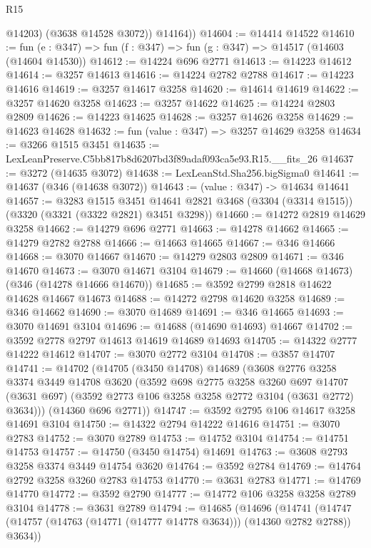 \begin{lexlean}{R15}
\begin{coremodule}
            @14203)
          (@3638 @14528 @3072))
        @14164))
@14604 := @14414 @14522
@14610 := fun (e : @347) => fun (f : @347) => fun (g : @347) => @14517 (@14603 (@14604 @14530))
@14612 := @14224 @696 @2771
@14613 := @14223 @14612
@14614 := @3257 @14613
@14616 := @14224 @2782 @2788
@14617 := @14223 @14616
@14619 := @3257 @14617 @3258
@14620 := @14614 @14619
@14622 := @3257 @14620 @3258
@14623 := @3257 @14622
@14625 := @14224 @2803 @2809
@14626 := @14223 @14625
@14628 := @3257 @14626 @3258
@14629 := @14623 @14628
@14632 := fun (value : @347) => @3257 @14629 @3258
@14634 := @3266 @1515 @3451
@14635 := LexLeanPreserve.C5bb817b8d6207bd3f89adaf093ca5e93.R15.__fits_26
@14637 := @3272 (@14635 @3072)
@14638 := LexLeanStd.Sha256.bigSigma0
@14641 := @14637 (@346 (@14638 @3072))
@14643 := (value : @347) -> @14634 @14641
@14657 := @3283
    @1515
    @3451
    @14641
    @2821
    @3468
    (@3304 (@3314 @1515))
    (@3320 (@3321 (@3322 @2821) @3451 @3298))
@14660 := @14272 @2819 @14629 @3258
@14662 := @14279 @696 @2771
@14663 := @14278 @14662
@14665 := @14279 @2782 @2788
@14666 := @14663 @14665
@14667 := @346 @14666
@14668 := @3070 @14667
@14670 := @14279 @2803 @2809
@14671 := @346 @14670
@14673 := @3070 @14671 @3104
@14679 := @14660 (@14668 @14673) (@346 (@14278 @14666 @14670))
@14685 := @3592 @2799 @2818 @14622 @14628 @14667 @14673
@14688 := @14272 @2798 @14620 @3258
@14689 := @346 @14662
@14690 := @3070 @14689
@14691 := @346 @14665
@14693 := @3070 @14691 @3104
@14696 := @14688 (@14690 @14693) @14667
@14702 := @3592 @2778 @2797 @14613 @14619 @14689 @14693
@14705 := @14322 @2777 @14222 @14612
@14707 := @3070 @2772 @3104
@14708 := @3857 @14707
@14741 := @14702
    (@14705
      (@3450 @14708)
      @14689
      (@3608
        @2776
        @3258
        @3374
        @3449
        @14708
        @3620
        (@3592
          @698
          @2775
          @3258
          @3260
          @697
          @14707
          (@3631 @697)
          (@3592 @2773 @106 @3258 @3258 @2772 @3104 (@3631 @2772) @3634)))
      (@14360 @696 @2771))
@14747 := @3592 @2795 @106 @14617 @3258 @14691 @3104
@14750 := @14322 @2794 @14222 @14616
@14751 := @3070 @2783
@14752 := @3070 @2789
@14753 := @14752 @3104
@14754 := @14751 @14753
@14757 := @14750 (@3450 @14754) @14691
@14763 := @3608 @2793 @3258 @3374 @3449 @14754 @3620
@14764 := @3592 @2784
@14769 := @14764 @2792 @3258 @3260 @2783 @14753
@14770 := @3631 @2783
@14771 := @14769 @14770
@14772 := @3592 @2790
@14777 := @14772 @106 @3258 @3258 @2789 @3104
@14778 := @3631 @2789
@14794 := @14685
    (@14696
      (@14741 (@14747 (@14757 (@14763 (@14771 (@14777 @14778 @3634))) (@14360 @2782 @2788)) @3634))

\end{coremodule}
\end{lexlean}
